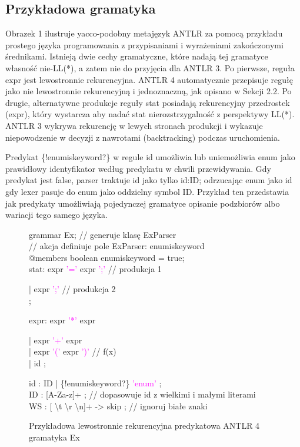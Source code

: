 ﻿\subsection{Przykładowa gramatyka}
Obrazek 1 ilustruje yacco-podobny metajęzyk ANTLR za pomocą przykładu prostego języka
programowania z przypisaniami i wyrażeniami zakończonymi średnikami. 
Istnieją dwie cechy gramatyczne, które nadają tej gramatyce własność nie-LL(*),
a zatem nie do przyjęcia dla ANTLR 3.
Po pierwsze, reguła expr jest lewostronnie rekurencyjna.
ANTLR 4 automatycznie przepisuje regułę jako nie lewostronnie rekurencyjną i jednoznaczną,
jak opisano w Sekcji 2.2. Po drugie, alternatywne produkcje reguły stat posiadają
rekurencyjny przedrostek (expr), który wystarcza aby nadać stat nierozstrzygalność
z perspektywy LL(*). ANTLR 3 wykrywa rekurencję w lewych stronach produkcji i
wykazuje niepowodzenie w decyzji z nawrotami (backtracking) podczas uruchomienia.
\par
Predykat \{!enum\textunderscore is\textunderscore keyword?\} w regule id
umożliwia lub uniemożliwia enum jako prawidłowy identyfikator według predykatu
w chwili przewidywania. Gdy predykat jest false, parser traktuje id jako
tylko id:ID; odrzucając enum jako id gdy lexer pasuje do enum jako oddzielny
symbol ID. Przykład ten przedstawia jak predykaty umożliwiają pojedynczej
gramatyce opisanie podzbiorów albo wariacji tego samego języka. 
\begin{figure}[!ht]
grammar Ex; \textcolor{PineGreen}{// generuje klasę ExParser} \\
\textcolor{PineGreen}{// akcja definiuje pole ExParser: enum\textunderscore is\textunderscore keyword} \\
@members { boolean enum\textunderscore is\textunderscore keyword = true;} \\
stat: expr \textcolor{magenta}{'='} expr \textcolor{magenta}{';'} \textcolor{PineGreen}{// produkcja 1}
\begin{adjustwidth}{1cm}{}
  | expr \textcolor{magenta}{';'} \textcolor{PineGreen}{// produkcja 2} \\
  ; 
\end{adjustwidth}
expr: expr \textcolor{magenta}{'*'} expr
\begin{adjustwidth}{1cm}{}
    | expr \textcolor{magenta}{'+'} expr \\
    | expr \textcolor{magenta}{'('} expr \textcolor{magenta}{')'} \textcolor{PineGreen}{// f(x)} \\
    | id 
    ; \\
\end{adjustwidth}    
id : ID | \{!enum\textunderscore is\textunderscore keyword?\} \textcolor{magenta}{'enum'} ; \\
ID : [A-Za-z]+ ; \textcolor{PineGreen}{// dopasowuje id z wielkimi i małymi literami} \\
WS : [ \textbackslash t \textbackslash r \textbackslash n]+ -> skip ; \textcolor{PineGreen}{// ignoruj białe znaki} \\
\caption{Przykładowa lewostronnie rekurencyjna predykatowa ANTLR 4 gramatyka Ex}
\end{figure}
